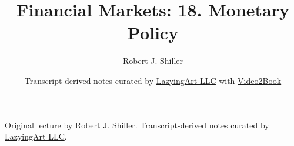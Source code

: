 \documentclass[11pt,oneside]{book}
\begin{document}
\frontmatter
\title{Financial Markets: 18. Monetary Policy}
\author{Robert J. Shiller}
\date{Transcript-derived notes curated by \href{https://lazying.art}{LazyingArt LLC} with \href{https://github.com/lachlanchen/Video2Book}{Video2Book}}
\maketitle
\begin{center}
\small Original lecture by Robert J. Shiller. Transcript-derived notes curated by \href{https://lazying.art}{LazyingArt LLC}.
\end{center}
\clearpage
\mainmatter

\end{document}
